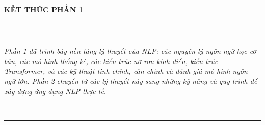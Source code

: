 \clearpage
\thispagestyle{empty}

\begin{center}
	\vspace*{4cm}
	{\Huge \textbf{KẾT THÚC PHẦN 1}} \\[1.5cm]

	\rule{0.8\textwidth}{0.4pt} \\[0.8cm]

	\parbox{0.9\textwidth}{
		\centering
		\textit{
			Phần 1 đã trình bày nền tảng lý thuyết của NLP: các nguyên lý
			ngôn ngữ học cơ bản, các mô hình thống kê, các kiến trúc nơ-ron
			kinh điển, kiến trúc Transformer, và các kỹ thuật tinh chỉnh,
			căn chỉnh và đánh giá mô hình ngôn ngữ lớn. Phần 2 chuyển từ
			các lý thuyết này sang những kỹ năng và quy trình để xây dựng
			ứng dụng NLP thực tế.
		}
	} \\[1cm]

	\rule{0.8\textwidth}{0.4pt} \\[2cm]
\end{center}